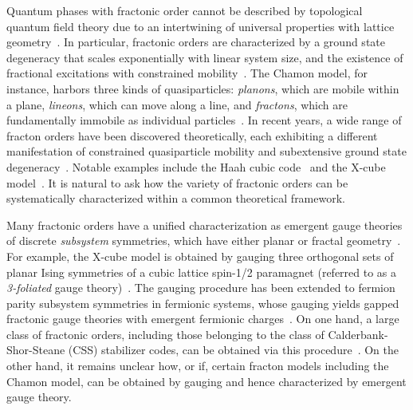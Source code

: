\documentclass[prx,twocolumn,superscriptaddress,nofootinbib,showpacs,notitlepage]{revtex4-2}
\newcommand{\Chamon}{Chamon }
\begin{document}
Quantum phases with fractonic order cannot be described by topological quantum field theory due to an intertwining of universal properties with lattice geometry~\cite{Gorantla2021,vijay_CB_2015,vijay2016fracton,PhysRevB.97.165106}. In particular, fractonic orders are characterized by a ground state degeneracy that scales exponentially with linear system size, and the existence of fractional excitations with constrained mobility~\cite{bravyi2011topological,Haah_code_2011,haah2013_thesis,haah2013commuting,vijay2016fracton}. The Chamon model, for instance, harbors three kinds of quasiparticles: \textit{planons}, which are mobile within a plane, \textit{lineons}, which can move along a line, and \textit{fractons}, which are fundamentally immobile as individual particles~\cite{bravyi2011topological}. In recent years, a wide range of fracton orders have been discovered theoretically, each exhibiting a different manifestation of constrained quasiparticle mobility and subextensive ground state degeneracy~\cite{Castelnovo_Chamon_2011,PhysRevB.81.184303,haah2011local,PhysRevLett.107.150504,kim20123d,yoshida2013exotic,bravyi2013quantum,haah2013_thesis,haah2013commuting,haah2014bifurcation, PhysRevLett.116.027202,vijay_CB_2015,vijay2016fracton,PhysRevB.95.245126,vijay2017isotropic,vijay2017generalization,PhysRevB.96.165106,PhysRevB.96.195139,HHB_models,hsieh_halasz_partons,PhysRevB.97.155111,PhysRevB.97.041110,PhysRevB.97.165106,Bulmash2018,PhysRevB.97.125102,PhysRevB.97.125101,PhysRevB.97.144106,finite_temp_Xcube,you2018symmetric,prem2018cage,Brown2019,Schmitz2019,You2019,You2019b,Weinstein2019,Prem2019,Bulmash2019,hao_twisted,Tantivasadakarn2,Tantivasadakarn_2021_nonabelian}. 
Notable examples include the Haah cubic code~\cite{haah2011local} and the X-cube model~\cite{vijay2016fracton}. It is natural to ask how the variety of fractonic orders can be systematically characterized within a common theoretical framework.

Many fractonic orders have a unified characterization as emergent gauge theories of discrete \textit{subsystem} symmetries, which have either planar or fractal geometry~\cite{vijay2016fracton,Williamson_cubic_code,shirley2018FoliatedFracton,kubica2018ungauging}. For example, the X-cube model is obtained by gauging three orthogonal sets of planar Ising symmetries of a cubic lattice spin-1/2 paramagnet (referred to as a \textit{3-foliated} gauge theory)~\cite{vijay2016fracton}.
The gauging procedure has been extended to fermion parity subsystem symmetries in fermionic systems, whose gauging yields gapped fractonic gauge theories with emergent fermionic charges~\cite{shirley2020fractonic,Tantivasadakarn1,}. On one hand, a large class of fractonic orders, including those belonging to the class of Calderbank-Shor-Steane (CSS) stabilizer codes, can be obtained via this procedure~\cite{kubica2018ungauging}. On the other hand, it remains unclear how, or if, certain fracton models including the \Chamon model, can be obtained by gauging and hence characterized by emergent gauge theory.
\end{document}
